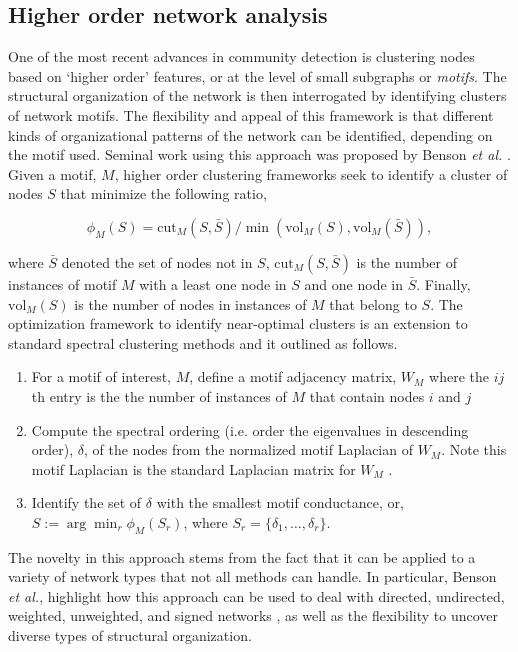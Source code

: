 \subsection{Higher order network analysis}
One of the most recent advances in community detection is clustering nodes based on `higher order' features, or at the level of small subgraphs or \emph{motifs}. The structural organization of the network is then interrogated by identifying clusters of network motifs. The flexibility and appeal of this framework is that different kinds of organizational patterns of the network can be identified, depending on the motif used. Seminal work using this approach was proposed by Benson \emph{et al.} \cite{Benson} . Given a motif, $M$, higher order clustering frameworks seek to identify a cluster of nodes $S$ that minimize the following ratio,

\begin{equation}
\phi_{M}(S)=\text{cut}_{M}(S,\bar{S})/\min(\text{vol}_{M}(S),\text{vol}_{M}(\bar{S})),
\end{equation}

where $\bar{S}$ denoted the set of nodes not in $S$, $\text{cut}_{M}(S,\bar{S})$ is the number of instances of motif $M$ with a least one node in $S$ and one node in $\bar{S}$. Finally, $\text{vol}_{M}(S)$ is the number of nodes in instances of $M$ that belong to $S$. The optimization framework to identify near-optimal clusters is an extension to standard spectral clustering methods and it outlined as follows. 
\begin{enumerate}
\item For a motif of interest, $M$, define a motif adjacency matrix, $W_{M}$ where the $ij$th entry is the the number of instances of $M$ that contain nodes $i$ and $j$
\item Compute the spectral ordering (i.e. order the eigenvalues in descending order), $\delta$, of the nodes from the normalized motif Laplacian of $W_{M}$. Note this motif Laplacian is the standard Laplacian matrix for $W_{M}$ \cite{laplacian}. 
\item Identify the set of $\delta$ with the smallest motif conductance, or, $S := \arg \min_{r} \phi_{M}(S_{r})$, where $S_{r}=\{\delta_{1}, \dots, \delta_{r}\}$. 
\end{enumerate}

The novelty in this approach stems from the fact that it can be applied to a variety of network types that not all methods can handle. In particular, Benson \emph{et al.}, highlight how this approach can be used to deal with directed, undirected, weighted, unweighted, and signed networks \cite{Benson}, as well as the flexibility to uncover diverse types of structural organization. 

